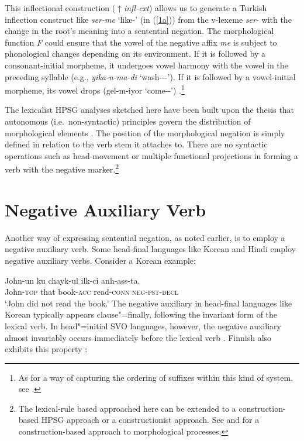 \documentclass[output=paper
                ,modfonts
                		,nonflat
	        ,collection
	        ,collectionchapter
	        ,collectiontoclongg
 	        ,biblatex
                ,babelshorthands
                ,newtxmath
                ,draftmode
                ,colorlinks, citecolor=brown
]{./langsci/langscibook}
\begin{document}
{\begin{exe}
\begin{xlist}
\begin{exe}
\begin{xlist}
{This inflectional construction ($\uparrow$\textit{infl-cxt}) allows us to generate a Turkish inflection construct like \textit{ser-me} `like-\NEG' (in (\ref{1a})) from the v-lexeme \textit{ser-} with the change in the root's meaning into a sentential negation. The morphological function \textit{F} could ensure that the vowel of the negative affix \textit{me} is subject to phonological changes depending on its environment. If it is followed by a consonant-initial morpheme, it undergoes vowel harmony with the vowel in the preceding syllable (e.g., \textit{yika-n-ma-di} `wash-\REFL-\NEG-\PST'). If it is followed by a vowel-initial morpheme, its vowel drops (gel-m-iyor `come-\NEG-\PROG')  \citep[see]{kelepir}.\footnote{As
 for a way of capturing the ordering of suffixes within this kind of system,
 see \citet{Kim:16}.}
}\fi

The lexicalist HPSG analyses sketched here
 have been built upon the
thesis that autonomous (i.e.\ non-syntactic) principles govern the
distribution of morphological elements \citep{BM:95}.
The position of the morphological negation is simply
defined in relation to
the verb stem it attaches to. There are no syntactic operations such
as head-movement or multiple functional projections in forming
a verb with the negative marker.\footnote{The lexical-rule based
approached here can be extended to a construction-based HPSG
approach or a constructionist approach. See
\citet{Sag:12} and \citet{Hilpert:16} for a construction-based
approach to morphological processes.}



\section{Negative Auxiliary Verb}

Another way of expressing sentential negation, as noted earlier, is to employ
a negative auxiliary
verb. Some head-final languages like Korean and Hindi employ
negative auxiliary verbs. Consider a Korean example:

\ea
\gll John-un ku chayk-ul ilk-ci anh-ass-ta. \\
     John-\textsc{top} that book-\textsc{acc} read-\textsc{conn} \textsc{neg}-\textsc{pst}-\textsc{decl}  \\
\glt `John did not read the book.'
\z
%
%
\noindent
The negative auxiliary in head-final languages like Korean
typically appears clause"=finally, following the invariant form of the lexical verb.
In head"=initial SVO languages, however, the negative auxiliary
almost invariably occurs immediately before the lexical verb
\citep{Payne:85}. Finnish also exhibits this property \citep{Mitchell:91}:


\end{xlist}
\end{exe}
\end{xlist}
\end{exe}}
\end{document}
